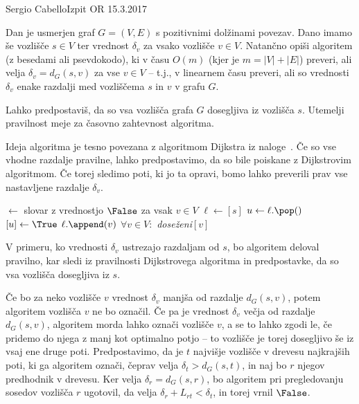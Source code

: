 \begin{naloga}{Sergio Cabello}{Izpit OR 15.3.2017}
\begin{vprasanje}
Dan je usmerjen graf $G = (V, E)$ s pozitivnimi dolžinami povezav.
Dano imamo še vozlišče $s \in V$
ter vrednost $\delta_v$ za vsako vozlišče $v \in V$.
Natančno opiši algoritem (z besedami ali psevdokodo),
ki v času $O(m)$ (kjer je $m = |V| + |E|$) preveri,
ali velja $\delta_v = d_G(s, v)$ za vse $v \in V$
-- t.j., v linearnem času preveri,
ali so vrednosti $\delta_v$
enake razdalji med vozliščema $s$ in $v$ v grafu $G$.

Lahko predpostaviš, da so vsa vozlišča grafa $G$ dosegljiva iz vozlišča $s$.
Utemelji pravilnost meje za časovno zahtevnost algoritma.
\end{vprasanje}

\begin{odgovor}
Ideja algoritma je tesno povezana z algoritmom {\sc Dijkstra}
iz naloge~\nal[dijkstra].
Če so vse vhodne razdalje pravilne,
lahko predpostavimo, da so bile poiskane z Dijkstrovim algoritmom.
Če torej sledimo poti, ki jo ta opravi,
bomo lahko preverili prav vse nastavljene razdalje $\delta_v$.
\begin{small}
\begin{algorithmic}
		\State \Return \False
	\EndIf
     $\gets$ slovar z vrednostjo $\False$
                                  za vsak $v \in V$
	\State $\ell \gets [s]$
		\State $u \gets \ell.\pop()$
		$[u] \gets \True$
					\State $\ell.\append(v)$
				\EndIf
				\State \Return \False
			\EndIf
		\EndFor
	\EndWhile
	\State \Return $\forall v \in V :$ {\sl doseženi}$[v]$
\EndFunction
\end{algorithmic}
\end{small}

V primeru, ko vrednosti $\delta_v$ ustrezajo razdaljam od $s$,
bo algoritem deloval pravilno,
kar sledi iz pravilnosti Dijkstrovega algoritma in predpostavke,
da so vsa vozlišča dosegljiva iz $s$.

Če bo za neko vozlišče $v$ vrednost $\delta_v$ manjša od razdalje $d_G(s, v)$,
potem algoritem vozlišča $v$ ne bo označil.
Če pa je vrednost $\delta_v$ večja od razdalje $d_G(s, v)$,
algoritem morda lahko označi vozlišče $v$,
a se to lahko zgodi le, če pridemo do njega z manj kot optimalno potjo
-- to vozlišče je torej dosegljivo še iz vsaj ene druge poti.
Predpostavimo, da je $t$ najvišje vozlišče v drevesu najkrajših poti,
ki ga algoritem označi, čeprav velja $\delta_t > d_G(s, t)$,
in naj bo $r$ njegov predhodnik v drevesu.
Ker velja $\delta_r = d_G(s, r)$,
bo algoritem pri pregledovanju sosedov vozlišča $r$ ugotovil,
da velja $\delta_r + L_{rt} < \delta_t$, in torej vrnil $\False$.


\end{odgovor}
\end{naloga}

